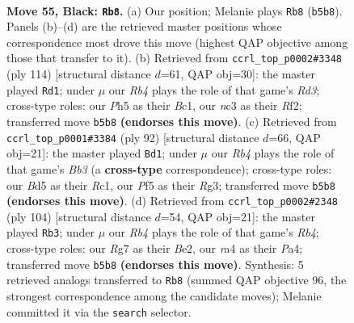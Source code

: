 \documentclass[11pt]{article}
\begin{document}
\clearpage

\begin{figure}[p]\centering
\begin{subfigure}{0.46\textwidth}\centering
\resizebox{\linewidth}{!}{%
\newchessgame
\chessboard[
  setfen={3k4/p1p3r1/P1p3p1/1rPb1p1p/RP3P1P/2N4R/5K2/8 b - - 33 55},
  showmover=false,
  pgfstyle=straightmove, color=movearrow, markmove={b5-b8}
]}
\caption{}
\end{subfigure}\hfill
\begin{subfigure}{0.46\textwidth}\centering
\resizebox{\linewidth}{!}{%
\newchessgame
\chessboard[
  setfen={2k3r1/p7/1pp1pbr1/6p1/PnNP2P1/1P1R3P/5RK1/2B5 w - - 2 58},
  showmover=false,
  pgfstyle=straightmove, color=movearrow, markmove={d3-d1}
]}
\caption{}
\end{subfigure}
\\[4pt]
\begin{subfigure}{0.46\textwidth}\centering
\resizebox{\linewidth}{!}{%
\newchessgame
\chessboard[
  setfen={7r/4b3/1p5r/nN1pk1p1/P3p3/1B2P1RP/5P2/2R2K2 w - - 10 47},
  showmover=false,
  pgfstyle=straightmove, color=movearrow, markmove={b3-d1}
]}
\caption{}
\end{subfigure}\hfill
\begin{subfigure}{0.46\textwidth}\centering
\resizebox{\linewidth}{!}{%
\newchessgame
\chessboard[
  setfen={r7/rp2k3/4p1p1/b1Pp1p2/PR1P3p/K3P2P/4B1P1/3R4 w - - 28 53},
  showmover=false,
  pgfstyle=straightmove, color=movearrow, markmove={b4-b3}
]}
\caption{}
\end{subfigure}
\caption{\textbf{Move 55, Black: \texttt{Rb8}.} (a) Our position; Melanie plays \texttt{Rb8} (\texttt{b5b8}). Panels (b)--(d) are the retrieved master positions whose correspondence most drove this move (highest QAP objective among those that transfer to it). (b) Retrieved from \texttt{ccrl\_top\_p0002\#3348} (ply 114) [structural distance $d$=61, QAP obj=30]: the master played \texttt{Rd1}; under $\mu$ our \emph{Rb4} plays the role of that game's \emph{Rd3}; cross-type roles: our \emph{P}h5 as their \emph{B}c1, our \emph{n}c3 as their \emph{R}f2; transferred move \texttt{b5b8} \textbf{(endorses this move)}. (c) Retrieved from \texttt{ccrl\_top\_p0001\#3384} (ply 92) [structural distance $d$=66, QAP obj=21]: the master played \texttt{Bd1}; under $\mu$ our \emph{Rb4} plays the role of that game's \emph{Bb3} (a \textbf{cross-type} correspondence); cross-type roles: our \emph{B}d5 as their \emph{R}c1, our \emph{P}f5 as their \emph{R}g3; transferred move \texttt{b5b8} \textbf{(endorses this move)}. (d) Retrieved from \texttt{ccrl\_top\_p0002\#2348} (ply 104) [structural distance $d$=54, QAP obj=21]: the master played \texttt{Rb3}; under $\mu$ our \emph{Rb4} plays the role of that game's \emph{Rb4}; cross-type roles: our \emph{R}g7 as their \emph{B}e2, our \emph{r}a4 as their \emph{P}a4; transferred move \texttt{b5b8} \textbf{(endorses this move)}. Synthesis: 5 retrieved analogs transferred to \texttt{Rb8} (summed QAP objective 96, the strongest correspondence among the candidate moves); Melanie committed it via the \texttt{search} selector.}
\label{fig:thought-m109}
\end{figure}
\end{document}
